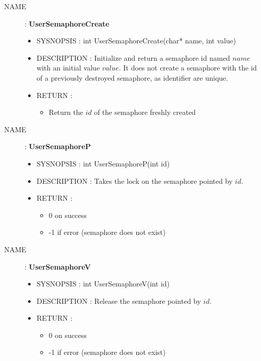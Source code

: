 \begin{description}
    \item [NAME] : \textbf{UserSemaphoreCreate}
        \begin{itemize}
            \item SYSNOPSIS : int UserSemaphoreCreate(char* name, int value)
            \item DESCRIPTION :
                Initialize and return a semaphore id named $name$ with an initial value $value$.
                It does not create a semaphore with the id of a previously
                destroyed semaphore, as identifier are unique.
            \item RETURN :
                \begin{itemize}
                    \item Return the $id$ of the semaphore freshly created
                \end{itemize}
        \end{itemize}

    \item [NAME] : \textbf{UserSemaphoreP}
        \begin{itemize}
            \item SYSNOPSIS : int UserSemaphoreP(int id)
            \item DESCRIPTION :
                Takes the lock on the semaphore pointed by $id$.
            \item RETURN :
                \begin{itemize}
                    \item 0 on success
                    \item -1 if error (semaphore does not exist)
                \end{itemize}
        \end{itemize}

    \item [NAME] : \textbf{UserSemaphoreV}
        \begin{itemize}
            \item SYSNOPSIS : int UserSemaphoreV(int id)
            \item DESCRIPTION :
                Release the semaphore pointed by $id$.
            \item RETURN :
                \begin{itemize}
                    \item 0 on success
                    \item -1 if error (semaphore does not exist)
                \end{itemize}
        \end{itemize}


\end{description}
